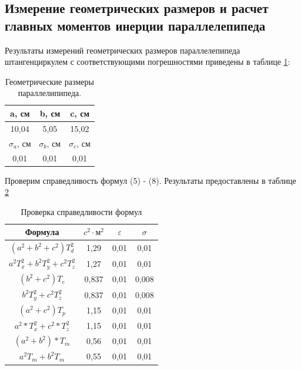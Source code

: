 \newpage

\subsection{Измерение геометрических размеров и расчет главных моментов инерции параллелепипеда}

Результаты измерений геометрических размеров параллелепипеда штангенциркулем с соответствующими погрешностями приведены в таблице \ref{tabl4}:


\begin{table}[h!]
\centering
\begin{tabular}{|c|c|c|}
\hline
a, см           & b, см           & c, см           \\ \hline
10,04           & 5,05            & 15,02           \\ \hline
$\sigma_{a}$, см & $\sigma_{b}$, см & $\sigma_{c}$, см \\ \hline
0,01            & 0,01            & 0,01            \\ \hline
\end{tabular}
\caption{Геометрические размеры параллелипипеда.}
\label{tabl4}
\end{table}

Проверим справедливость формул (5) - (8). Результаты предоставлены в таблице \ref{tabl5}

\begin{table}[h!]
\centering
\begin{tabular}{|cl|c|c|c|}
\hline
\multicolumn{2}{|c|}{Формула}                         & $c^2 \cdot \text{м}^2$ & $\varepsilon$ & $\sigma$ \\ \hline
\multicolumn{2}{|c|}{$(a^2+b^2+c^2)T_d^2$}            & 1,29       & 0,01     & 0,01          \\ \hline
\multicolumn{2}{|c|}{$a^2T_x^2+b^2T_y^2+c^2T_z^2$}    & 1,27       & 0,01     & 0,01          \\ \hline
\multicolumn{2}{|c|}{$(b^2+c^2)T_e$}                  & 0,837      & 0,01     & 0,008         \\ \hline
\multicolumn{2}{|c|}{$b^2T_y^2+c^2T_z^2$}             & 0,837      & 0,01     & 0,008         \\ \hline
\multicolumn{2}{|c|}{$(a^2+c^2)T_p$}                  & 1,15       & 0,01     & 0,01          \\ \hline
\multicolumn{2}{|c|}{$a^2*T_x^2+c^2*T_z^2$}           & 1,15       & 0,01     & 0,01          \\ \hline
\multicolumn{2}{|c|}{$(a^2+b^2)*T_m$}                 & 0,56       & 0,01     & 0,01          \\ \hline
\multicolumn{2}{|c|}{$a^2T_m + b^2T_m$}               & 0,55       & 0,01     & 0,01          \\ \hline
\end{tabular}
\caption{Проверка справедливости формул}
\label{tabl5}
\end{table}

